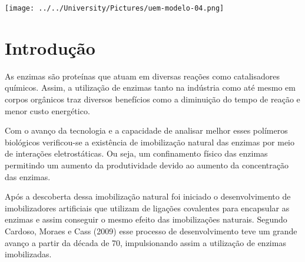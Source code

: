 \documentclass[
	12pt,				%
	openright,			%
	oneside,			%
	a4paper,			%
	english,			%
	french,				%
	spanish,			%
	brazil				%
	]{abntex2}
\begin{document}
\begin{minipage}[c][0cm][c]{0cm} %

\centering

\texttt{[image: ../../University/Pictures/uem-modelo-04.png]} 
\end{minipage}


\frenchspacing 


\imprimircapa



 
 


\tableofcontents*
\cleardoublepage

\textual

\section{Introdução}
\pagestyle{fancy}

As enzimas são proteínas que atuam em diversas reações como catalisadores químicos. Assim, a utilização de enzimas tanto na indústria como até mesmo em corpos orgânicos traz diversos benefícios como a diminuição do tempo de reação e menor custo energético. \cite{nelson2002leninger}

Com o avanço da tecnologia e a capacidade de analisar melhor esses polímeros biológicos verificou-se a existência de imobilização natural das enzimas por meio de interações eletrostáticas. Ou seja, um confinamento físico das enzimas permitindo um aumento da produtividade devido ao aumento da concentração das enzimas. \cite{covizzi2007imobilizaccao}

Após a descoberta dessa imobilização natural foi iniciado o desenvolvimento de imobilizadores artificiais que utilizam de ligações covalentes para encapsular as enzimas e assim conseguir o mesmo efeito das imobilizações naturais. Segundo Cardoso, Moraes e Cass (2009) esse processo de desenvolvimento teve um grande avanço a partir da década de 70, impulsionando assim a utilização de enzimas imobilizadas. \cite{cardoso2009imobilizaccao}
\end{document}
